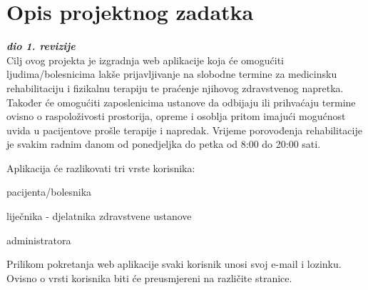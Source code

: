
\chapter{Opis projektnog zadatka}
		
		\textbf{\textit{dio 1. revizije}}\\
		
		
		Cilj ovog projekta je izgradnja web aplikacije koja će omogućiti ljudima/bolesnicima lakše prijavljivanje na slobodne termine za medicinsku rehabilitaciju i fizikalnu terapiju te praćenje njihovog zdravstvenog napretka. Također će omogućiti zaposlenicima ustanove da odbijaju ili prihvaćaju termine ovisno o raspoloživosti prostorija, opreme i osoblja pritom imajući mogućnost uvida u pacijentove prošle terapije i napredak. Vrijeme porovođenja rehabilitacije je svakim radnim danom od ponedjeljka do petka od 8:00 do 20:00 sati.
		
		\noindent Aplikacija će razlikovati tri vrste korisnika: 
		\begin{packed_item}
			
			\item  pacijenta/bolesnika
			\item  liječnika - djelatnika zdravstvene ustanove
			\item  administratora
		\end{packed_item}
		
		Prilikom pokretanja web aplikacije svaki korisnik unosi svoj e-mail i lozinku. Ovisno o vrsti korisnika biti će preusmjereni na različite stranice.
		
